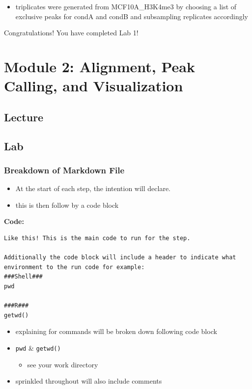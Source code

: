 \documentclass[
]{book}
\providecommand{\tightlist}{%
  \setlength{\itemsep}{0pt}\setlength{\parskip}{0pt}}
\begin{document}
\begin{itemize}
\tightlist
\item
  triplicates were generated from MCF10A\_H3K4me3 by choosing a list of exclusive peaks for condA and condB and subsampling replicates accordingly
\end{itemize}

Congratulations! You have completed Lab 1!

\chapter{Module 2: Alignment, Peak Calling, and Visualization}\label{module-2-alignment-peak-calling-and-visualization}

\section{Lecture}\label{lecture-1}

\section{Lab}\label{lab-1}

\subsection{Breakdown of Markdown File}\label{breakdown-of-markdown-file-1}

\begin{itemize}
\tightlist
\item
  At the start of each step, the intention will declare.
\item
  this is then follow by a code block
\end{itemize}

\textbf{Code:}

\begin{verbatim}
Like this! This is the main code to run for the step.

Additionally the code block will include a header to indicate what environment to the run code for example:
###Shell###
pwd

###R###
getwd()
\end{verbatim}

\begin{itemize}
\tightlist
\item
  explaining for commands will be broken down following code block
\item
  \texttt{pwd} \& \texttt{getwd()}

  \begin{itemize}
  \tightlist
  \item
    see your work directory
  \end{itemize}
\item
  sprinkled throughout will also include comments
\end{itemize}
\end{document}
